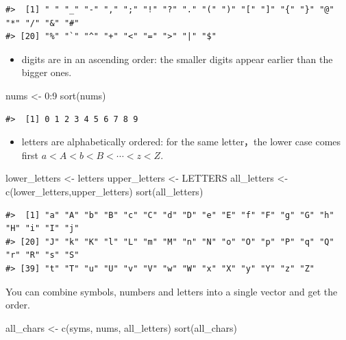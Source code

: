\documentclass[
]{book}
\newenvironment{Shaded}{\begin{snugshade}}{\end{snugshade}}
\newcommand{\DecValTok}[1]{\textcolor[rgb]{0.00,0.00,0.81}{#1}}
\newcommand{\FunctionTok}[1]{\textcolor[rgb]{0.00,0.00,0.00}{#1}}
\newcommand{\NormalTok}[1]{#1}
\newcommand{\OtherTok}[1]{\textcolor[rgb]{0.56,0.35,0.01}{#1}}
\newcommand{\SpecialCharTok}[1]{\textcolor[rgb]{0.00,0.00,0.00}{#1}}
\providecommand{\tightlist}{%
  \setlength{\itemsep}{0pt}\setlength{\parskip}{0pt}}
\begin{document}
\begin{verbatim}
#>  [1] " " "_" "-" "," ";" "!" "?" "." "(" ")" "[" "]" "{" "}" "@" "*" "/" "&" "#"
#> [20] "%" "`" "^" "+" "<" "=" ">" "|" "$"
\end{verbatim}

\begin{itemize}
\tightlist
\item
  digits are in an ascending order: the smaller digits appear earlier than the bigger ones.
\end{itemize}

\begin{Shaded}
\begin{Highlighting}[]
\NormalTok{nums }\OtherTok{\textless{}{-}} \DecValTok{0}\SpecialCharTok{:}\DecValTok{9}
\FunctionTok{sort}\NormalTok{(nums)}
\end{Highlighting}
\end{Shaded}

\begin{verbatim}
#>  [1] 0 1 2 3 4 5 6 7 8 9
\end{verbatim}

\begin{itemize}
\tightlist
\item
  letters are alphabetically ordered: for the same letter，the lower case comes first
  \(a<A<b<B<\cdots<z<Z\).
\end{itemize}

\begin{Shaded}
\begin{Highlighting}[]
\NormalTok{lower\_letters }\OtherTok{\textless{}{-}}\NormalTok{ letters}
\NormalTok{upper\_letters }\OtherTok{\textless{}{-}}\NormalTok{ LETTERS}
\NormalTok{all\_letters }\OtherTok{\textless{}{-}} \FunctionTok{c}\NormalTok{(lower\_letters,upper\_letters)}
\FunctionTok{sort}\NormalTok{(all\_letters)}
\end{Highlighting}
\end{Shaded}

\begin{verbatim}
#>  [1] "a" "A" "b" "B" "c" "C" "d" "D" "e" "E" "f" "F" "g" "G" "h" "H" "i" "I" "j"
#> [20] "J" "k" "K" "l" "L" "m" "M" "n" "N" "o" "O" "p" "P" "q" "Q" "r" "R" "s" "S"
#> [39] "t" "T" "u" "U" "v" "V" "w" "W" "x" "X" "y" "Y" "z" "Z"
\end{verbatim}

You can combine symbols, numbers and letters into a single vector and get the order.

\begin{Shaded}
\begin{Highlighting}[]
\NormalTok{all\_chars }\OtherTok{\textless{}{-}} \FunctionTok{c}\NormalTok{(syms, nums, all\_letters)}
\FunctionTok{sort}\NormalTok{(all\_chars)}
\end{Highlighting}
\end{Shaded}
\end{document}
